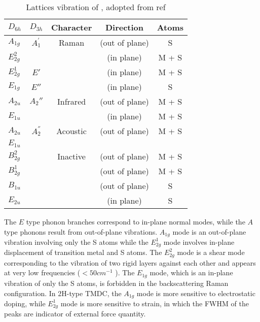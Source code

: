 \begin{table}[htb]
\centering
\caption{Lattices vibration of , adopted from ref\cite{Molina-Sanchez2011}}\label{tab:tmslattice}
\begin{tabular}{lcccc}
\toprule
 $D_{6h}$   & $D_{3h}$ & Character &  Direction & Atoms  \\
\midrule
$A_{1g}$    &  $A_1^{'}$   & Raman     & (out of plane)  & S  \\
$E_{2g}^2$  &          &           & (in plane)      & M + S  \\
$E_{2g}^1$  &  $E'$    &           & (in plane)      & M + S  \\
$E_{1g}$    &  $E''$    &           & (in plane)      & S  \\
\midrule
$A_{2u}$    &  $A_2''$  & Infrared  & (out of plane)  & M + S  \\
$E_{1u}$    &          &           & (in plane)      & M + S  \\
\midrule
$A_{2u}$    &  $A_2^{''}$   & Acoustic  & (out of plane)  & M + S  \\
$E_{1u}$    &          &           &       &    \\
\midrule
$B_{2g}^2$  &          & Inactive  & (out of plane)  & M + S  \\
$B_{2g}^1$  &          &           & (out of plane)  & M + S  \\
$B_{1u}$    &          &           & (out of plane)  & S  \\
$E_{2u}$    &          &           & (in plane)      & S  \\
\bottomrule
\end{tabular}
\end{table}

The $E$ type phonon branches correspond to in-plane normal modes, while the $A$ type phonons result from out-of-plane vibrations. $A_{1g}$ mode is an out-of-plane vibration involving only the S atoms while the $E_{2g}^1$ mode involves in-plane displacement of transition metal and S atoms. The $E_{2g}^2$ mode is a shear mode corresponding to the vibration of two rigid layers against
each other and appears at very low frequencies ($<50 cm^{-1}$ \cite{Zhang2013e}). The $E_{1g}$ mode, which is an in-plane vibration of only the S atoms, is forbidden in the backscattering Raman configuration. In 2H-type TMDC, the $A_{1g}$ mode is more sensitive to electrostatic doping, while $E_{2g}^1$ mode is more sensitive to strain, in which the FWHM of the peaks are indicator of external force quantity.\cite{Zhao2013}

